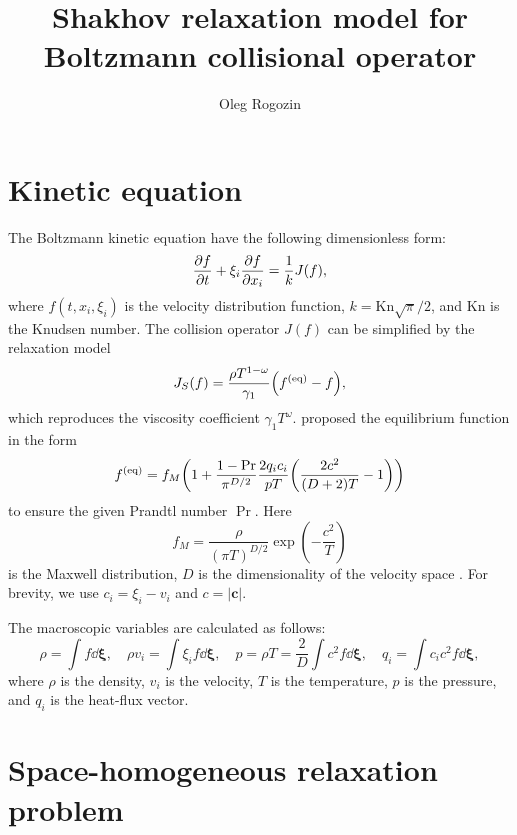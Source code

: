 \documentclass{article}
\title{Shakhov relaxation model for Boltzmann collisional operator}
\author{Oleg Rogozin}
\newcommand{\Kn}{\mathrm{Kn}}
\newcommand{\equil}[1]{#1^\mathrm{(eq)}}
\newcommand{\bxi}{\boldsymbol{\xi}}
\begin{document}
\maketitle
\tableofcontents

\section{Kinetic equation}

The Boltzmann kinetic equation have the following dimensionless form:
\begin{equation}\label{eq:Boltzmann}
    \pdv{f}{t} + \xi_i\pdv{f}{x_i} = \frac1kJ(f),
\end{equation}
where $f(t,x_i,\xi_i)$ is the velocity distribution function, $k=\Kn\sqrt\pi/2$,
and $\Kn$ is the Knudsen number.
The collision operator $J(f)$ can be simplified by the relaxation model
\begin{equation}\label{eq:model}
    J_S(f) = \frac{\rho T^{1-\omega}}{\gamma_1}\qty(\equil{f} - f),
\end{equation}
which reproduces the viscosity coefficient $\gamma_1T^\omega$.
\textcite{shakhov1968generalization} proposed the equilibrium function in the form
\begin{equation}\label{eq:Shakhov}
    \equil{f} = f_M\qty(1 + \frac{1-\Pr}{\pi^{D/2}}\frac{2q_ic_i}{pT}\qty(\frac{2c^2}{(D+2)T} - 1))
\end{equation}
to ensure the given Prandtl number $\Pr$. Here
\begin{equation}\label{eq:Maxwell}
    f_M = \frac{\rho}{(\pi T)^{D/2}}\exp(-\frac{c^2}T)
\end{equation}
is the Maxwell distribution, $D$ is the dimensionality of the velocity space .
For brevity, we use \(c_i = \xi_i - v_i\) and \(c = |\boldsymbol{c}|\).

The macroscopic variables are calculated as follows:
\begin{equation}\label{eq:macro}
    \rho = \int f \dd\bxi, \quad
    \rho v_i = \int \xi_i f \dd\bxi, \quad
    p = \rho T = \frac2D\int c^2 f \dd\bxi, \quad
    q_i = \int c_i c^2 f \dd\bxi,
\end{equation}
where \(\rho\) is the density, \(v_i\) is the velocity, \(T\) is the temperature, \(p\) is the pressure,
and \(q_i\) is the heat-flux vector.

\section{Space-homogeneous relaxation problem}
\end{document}
